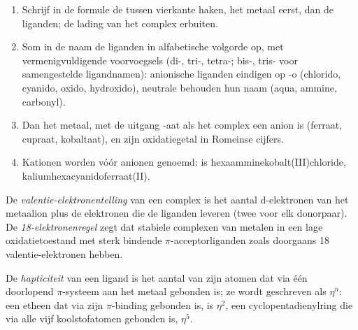 \begin{method}\label{met:b2:coordination-complexes:naming}
\begin{enumerate}
  \item Schrijf in de formule de  tussen vierkante haken, het metaal
        eerst, dan de liganden; de lading van het complex erbuiten.
  \item Som in de naam de liganden in alfabetische volgorde op, met vermenigvuldigende
        voorvoegsels (di-, tri-, tetra-; bis-, tris- voor samengestelde ligandnamen): anionische
        liganden eindigen op -o (chlorido, cyanido, oxido, hydroxido), neutrale behouden
        hun naam (aqua, ammine, carbonyl).
  \item Dan het metaal, met de uitgang -aat als het complex een anion is (ferraat,
        cupraat, kobaltaat), en zijn oxidatiegetal in Romeinse cijfers.
  \item Kationen worden vóór anionen genoemd:  is
        hexaamminekobalt(III)chloride, 
        kaliumhexacyanidoferraat(II).
\end{enumerate}
\end{method}

\begin{definition}[Elektronentelling]\label{def:b2:coordination-complexes:electron-count}
De \emph{valentie-elektronentelling} van een complex is het
aantal d-elektronen van het metaalion plus de elektronen die de liganden leveren (twee
voor elk donorpaar). De \emph{18-elektronenregel} zegt dat
stabiele complexen van metalen in een lage oxidatietoestand met sterk bindende $\pi$-acceptorliganden
zoals  doorgaans 18 valentie-elektronen hebben.
\end{definition}

\begin{definition}[Hapticiteit]\label{def:b2:coordination-complexes:hapticity}
De \emph{hapticiteit} van een ligand is het aantal van zijn atomen dat
via één doorlopend $\pi$-systeem aan het metaal gebonden is; ze wordt geschreven als $\eta^n$: een etheen dat via
zijn $\pi$-binding gebonden is, is $\eta^2$, een cyclopentadienylring die via alle vijf koolstofatomen gebonden is, $\eta^5$.
\end{definition}

